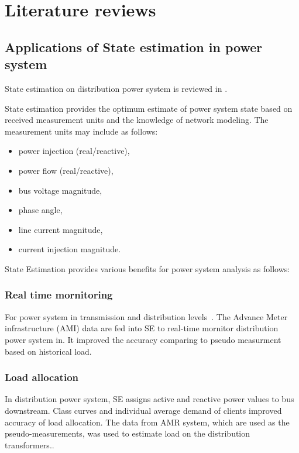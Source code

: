 \section{Literature reviews}

\subsection{Applications of State estimation in power system}



State estimation on distribution power system is reviewed in \cite{b9}.

State estimation provides the optimum estimate of power system state based on received measurement units and the knowledge of network modeling. The measurement units may include as follows:
\begin{itemize}
  \item power injection (real/reactive),
  \item power flow (real/reactive),
  \item bus voltage magnitude,
  \item phase angle,
  \item line current magnitude,
  \item current injection magnitude.
\end{itemize}

State Estimation provides various benefits for power system analysis as follows:

\subsubsection{Real time mornitoring}

For power system in transmission and distribution levels~\cite{b5}. The Advance Meter infrastructure (AMI) data are fed into SE to real-time mornitor distribution power system in\cite{b7}. It improved the accuracy comparing to pseudo measurment based on historical load.

\subsubsection{Load allocation}
In distribution power system, SE assigns active and reactive power values to bus downstream\cite{b6}. Class curves and individual average demand of clients improved accuracy of load allocation\cite{b4}.  The data from AMR system, which are used as the pseudo-measurements, was used to estimate load on the distribution transformers.\cite{b5}.

